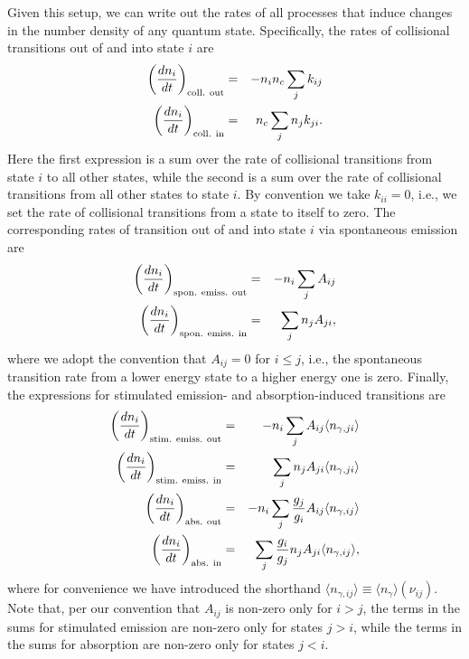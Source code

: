 Given this setup, we can write out the rates of all processes that induce changes in the number density of any quantum state. Specifically, the rates of collisional transitions out of and into state $i$ are
\begin{eqnarray}
\left(\frac{dn_i}{dt}\right)_{\rm coll.~out} & = & -n_i n_c \sum_j k_{ij} \\
\left(\frac{dn_i}{dt}\right)_{\rm coll.~in} & = & n_c \sum_j n_j k_{ji}.
\end{eqnarray}
Here the first expression is a sum over the rate of collisional transitions from state $i$ to all other states, while the second is a sum over the rate of collisional transitions from all other states to state $i$. By convention we take $k_{ii} = 0$, i.e., we set the rate of collisional transitions from a state to itself to zero. The corresponding rates of transition out of and into state $i$ via spontaneous emission are
\begin{eqnarray}
\left(\frac{dn_i}{dt}\right)_{\rm spon.~emiss.~out} & = & -n_i \sum_j A_{ij} \\
\left(\frac{dn_i}{dt}\right)_{\rm spon.~emiss.~in} & = & \sum_j n_j A_{ji},
\end{eqnarray}
where we adopt the convention that $A_{ij} = 0$ for $i \leq j$, i.e., the spontaneous transition rate from a lower energy state to a higher energy one is zero. Finally, the expressions for stimulated emission- and absorption-induced transitions are
\begin{eqnarray}
\left(\frac{dn_i}{dt}\right)_{\rm stim.~emiss.~out} & = & -n_i \sum_j A_{ij} \langle n_{\gamma,ji}\rangle \\
\left(\frac{dn_i}{dt}\right)_{\rm stim.~emiss.~in} & = & \sum_j n_j A_{ji} \langle n_{\gamma,ji}\rangle \\
\left(\frac{dn_i}{dt}\right)_{\rm abs.~out} & = & -n_i \sum_j \frac{g_j}{g_i} A_{ij} \langle n_{\gamma,ij}\rangle \\
\left(\frac{dn_i}{dt}\right)_{\rm abs.~in} & = & \sum_j \frac{g_i}{g_j} n_j A_{ji} \langle n_{\gamma,ij}\rangle,
\end{eqnarray}
where for convenience we have introduced the shorthand $\langle n_{\gamma,ij}\rangle \equiv \langle n_{\gamma}\rangle(\nu_{ij})$. Note that, per our convention that $A_{ij}$ is non-zero only for $i > j$, the terms in the sums for stimulated emission are non-zero only for states $j > i$, while the terms in the sums for absorption are non-zero only for states $j < i$.

